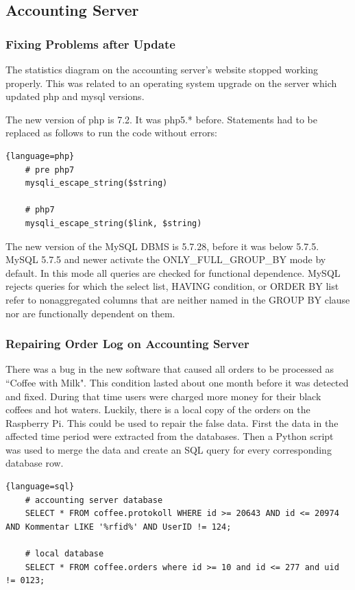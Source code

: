 \documentclass[12pt]{article}
\begin{document}
\subsection{Accounting Server}
\subsubsection{Fixing Problems after Update}
The statistics diagram on the accounting server's website stopped working properly.
This was related to an operating system upgrade on the server which updated php and mysql versions.

The new version of php is 7.2. It was php5.* before.
Statements had to be replaced as follows to run the code without errors:
\begin{lstlisting}{language=php}
    # pre php7
    mysqli_escape_string($string)
    
    # php7
    mysqli_escape_string($link, $string)
  \end{lstlisting}

The new version of the MySQL DBMS is 5.7.28, before it was below 5.7.5.
MySQL 5.7.5 and newer activate the ONLY\_FULL\_GROUP\_BY mode by default.
In this mode all queries are checked for functional dependence.
MySQL rejects queries for which the select list, HAVING condition,
or ORDER BY list refer to nonaggregated columns that are
neither named in the GROUP BY clause nor are functionally dependent on them.

\subsubsection{Repairing Order Log on Accounting Server}
There was a bug in the new software that caused all orders to be processed as ``Coffee with Milk". This condition lasted about one month before it was detected and fixed.
During that time users were charged more money for their black coffees and hot waters. Luckily, there is a local copy of the orders on the Raspberry Pi. This could be used to repair the false data.
First the data in the affected time period were extracted from the databases. Then a Python script was used to merge the data and create an SQL query for every corresponding database row.

\begin{lstlisting}{language=sql}
    # accounting server database
    SELECT * FROM coffee.protokoll WHERE id >= 20643 AND id <= 20974 AND Kommentar LIKE '%rfid%' AND UserID != 124;

    # local database 
    SELECT * FROM coffee.orders where id >= 10 and id <= 277 and uid != 0123;
\end{lstlisting}
\end{document}
